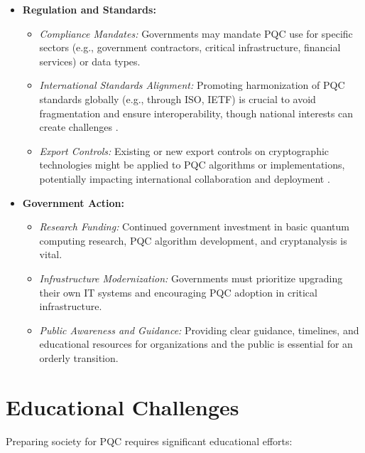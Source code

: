 \begin{itemize}
    \item \textbf{Regulation and Standards:}
    \begin{itemize}
        \item \textit{Compliance Mandates:} Governments may mandate PQC use for specific sectors (e.g., government contractors, critical infrastructure, financial services) or data types.
        \item \textit{International Standards Alignment:} Promoting harmonization of PQC standards globally (e.g., through ISO, IETF) is crucial to avoid fragmentation and ensure interoperability, though national interests can create challenges \parencite{pqc_standards_cooperation}.
        \item \textit{Export Controls:} Existing or new export controls on cryptographic technologies might be applied to PQC algorithms or implementations, potentially impacting international collaboration and deployment \parencite{crypto_export_controls}.
    \end{itemize}
    \item \textbf{Government Action:}
    \begin{itemize}
        \item \textit{Research Funding:} Continued government investment in basic quantum computing research, PQC algorithm development, and cryptanalysis is vital.
        \item \textit{Infrastructure Modernization:} Governments must prioritize upgrading their own IT systems and encouraging PQC adoption in critical infrastructure.
        \item \textit{Public Awareness and Guidance:} Providing clear guidance, timelines, and educational resources for organizations and the public is essential for an orderly transition.
    \end{itemize}
\end{itemize}

\section{Educational Challenges}\label{sec:education_ch9}

Preparing society for PQC requires significant educational efforts:

